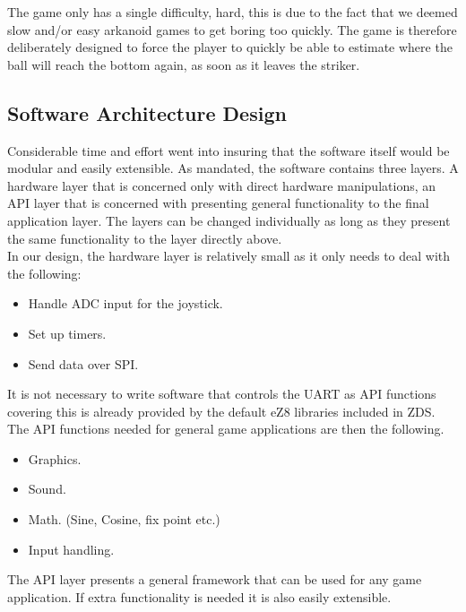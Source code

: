 The game only has a single difficulty, hard, this is due to the fact that we deemed slow and/or
easy arkanoid games to get boring too quickly. The game is therefore deliberately designed to 
force the player to quickly be able to estimate where the ball will reach the bottom again, as 
soon as it leaves the striker.

\subsection{Software Architecture Design}
Considerable time and effort went into insuring that the software itself would be modular and easily extensible.
As mandated, the software contains three layers. A hardware layer that is concerned only with
direct hardware manipulations, an API layer that is concerned with presenting general functionality to
the final application layer. The layers can be changed individually as long as they present the
same functionality to the layer directly above. \\

In our design, the hardware layer is relatively small as it only needs to deal with the following:

\begin{itemize}
	\item Handle ADC input for the joystick.
	\item Set up timers.
	\item Send data over SPI.
\end{itemize}

It is not necessary to write software that controls the UART as API functions covering  this
 is already provided by the default eZ8 libraries included in ZDS. \\

The API functions needed for general game applications are then the following.

\begin{itemize}
	\item Graphics.
	\item Sound.
	\item Math. (Sine, Cosine, fix point etc.)
	\item Input handling.
\end{itemize}

The API layer presents a general framework that can be used for any game application. If extra
functionality is needed it is also easily extensible. \\

